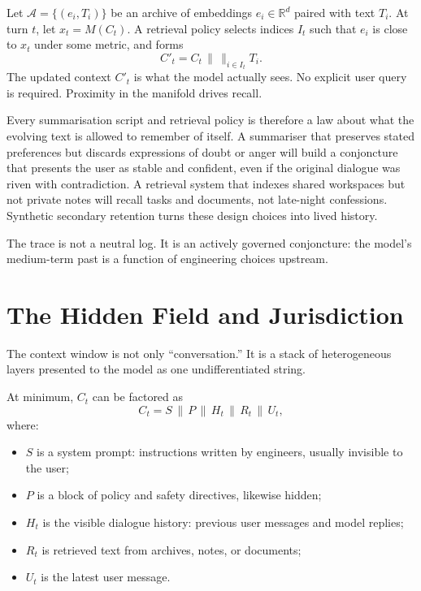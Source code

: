 \documentclass[12pt,a4paper]{article}
\begin{document}
\begin{formalbox}[title={Synthetic Secondary Retention}]
Let $\mathcal{A} = \{(e_i, T_i)\}$ be an archive of embeddings $e_i \in \mathbb{R}^d$ paired with text $T_i$. At turn $t$, let $x_t = M(C_t)$. A retrieval policy selects indices $I_t$ such that $e_i$ is close to $x_t$ under some metric, and forms
\[
C'_t = C_t \,\|\, \big\|_{i \in I_t} T_i.
\]
The updated context $C'_t$ is what the model actually sees. No explicit user query is required. Proximity in the manifold drives recall.
\end{formalbox}

Every summarisation script and retrieval policy is therefore a law about what the evolving text is allowed to remember of itself. A summariser that preserves stated preferences but discards expressions of doubt or anger will build a conjoncture that presents the user as stable and confident, even if the original dialogue was riven with contradiction. A retrieval system that indexes shared workspaces but not private notes will recall tasks and documents, not late-night confessions. Synthetic secondary retention turns these design choices into lived history.

The trace is not a neutral log. It is an actively governed conjoncture: the model's medium-term past is a function of engineering choices upstream.

\section{The Hidden Field and Jurisdiction}

The context window is not only ``conversation.'' It is a stack of heterogeneous layers presented to the model as one undifferentiated string.

At minimum, $C_t$ can be factored as
\[
C_t = S \,\|\, P \,\|\, H_t \,\|\, R_t \,\|\, U_t,
\]
where:

\begin{itemize}
  \item $S$ is a system prompt: instructions written by engineers, usually invisible to the user;
  \item $P$ is a block of policy and safety directives, likewise hidden;
  \item $H_t$ is the visible dialogue history: previous user messages and model replies;
  \item $R_t$ is retrieved text from archives, notes, or documents;
  \item $U_t$ is the latest user message.
\end{itemize}
\end{document}
